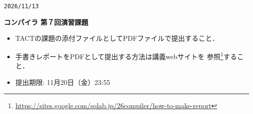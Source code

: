 \documentclass[dvipdfmx]{jarticle}
\begin{document}
\begin{flushright}
    \verb|2026/11/13|
\end{flushright}
\begin{center}
    {\Large\bf コンパイラ 第７回演習課題}
\end{center}


\begin{itemize}
    \item TACTの課題の添付ファイルとしてPDFファイルで提出すること．
    \item 手書きレポートをPDFとして提出する方法は講義webサイトを
          参照\footnote{\url{https://sites.google.com/sqlab.jp/26compiler/how-to-make-report}}すること．
    \item 提出期限: {11月20日（金）23:55}
\end{itemize}
\end{document}

